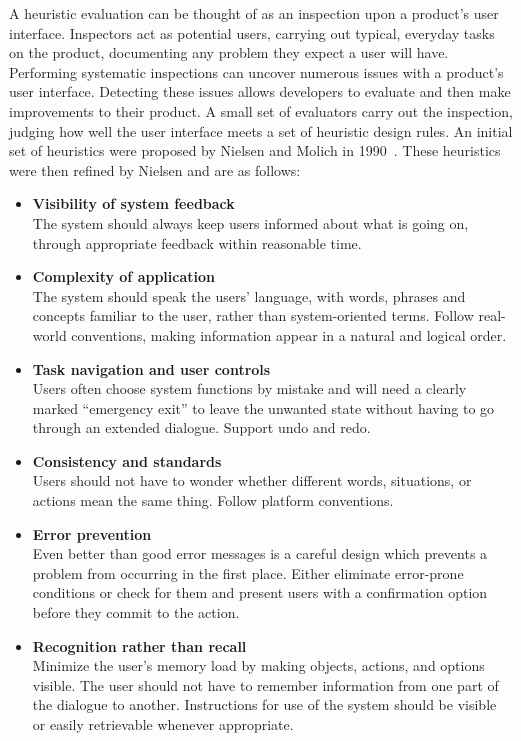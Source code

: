 \documentclass[11pt,a4paper]{article}
\begin{document}
A heuristic evaluation can be thought of as an inspection upon a product's user interface. Inspectors act as potential users, carrying out typical, everyday tasks on the product, documenting any problem they expect a user will have. Performing systematic inspections can uncover numerous issues with a product's user interface. Detecting these issues allows developers to evaluate and then make improvements to their product. A small set of evaluators carry out the inspection, judging how well the user interface meets a set of heuristic design rules. An initial set of heuristics were proposed by Nielsen and Molich in 1990~\cite{nielsen1990}. These heuristics were then refined by Nielsen and are as follows:

\begin{itemize}
  \item \textbf{Visibility of system feedback}\\ The system should always keep users informed about what is going on, through
  appropriate feedback within reasonable time.
  \item \textbf{Complexity of application}\\ The system should speak the users' language, with words, phrases and concepts
  familiar to the user, rather than system-oriented terms. Follow real-world conventions, making information appear in a natural and logical order.
  \item \textbf{Task navigation and user controls}\\ Users often choose system functions by mistake and will need a clearly marked
  ``emergency exit'' to leave the unwanted state without having to go through an extended dialogue. Support undo and redo.
  \item \textbf{Consistency and standards}\\ Users should not have to wonder whether different words, situations, or actions mean the same thing. Follow platform conventions.
  \item \textbf{Error prevention}\\ Even better than good error messages is a careful design which prevents a problem from occurring in the first place. Either eliminate error-prone conditions or check for them and present users with a confirmation option before they commit to the action.
  \item \textbf{Recognition rather than recall}\\ Minimize the user's memory load by making objects, actions, and options visible. The user should not have to remember information from one part of the dialogue to another. Instructions for use of the system should be visible or easily retrievable whenever appropriate.

\end{itemize}
\end{document}
